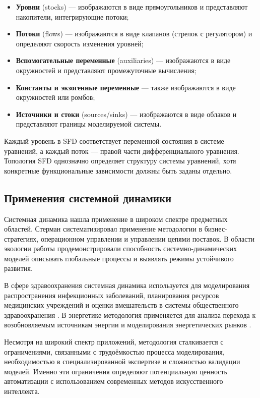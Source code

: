 \begin{itemize}
    \item \textbf{Уровни} (stocks) --- изображаются в виде прямоугольников и представляют накопители, интегрирующие потоки;
    \item \textbf{Потоки} (flows) --- изображаются в виде клапанов (стрелок с регулятором) и определяют скорость изменения уровней;
    \item \textbf{Вспомогательные переменные} (auxiliaries) --- изображаются в виде окружностей и представляют промежуточные вычисления;
    \item \textbf{Константы и экзогенные переменные} --- также изображаются в виде окружностей или ромбов;
    \item \textbf{Источники и стоки} (sources/sinks) --- изображаются в виде облаков и представляют границы моделируемой системы.
\end{itemize}

Каждый уровень в SFD соответствует переменной состояния в системе уравнений, а каждый поток --- правой части дифференциального уравнения. Топология SFD однозначно определяет структуру системы уравнений, хотя конкретные функциональные зависимости должны быть заданы отдельно.

\subsection{Применения системной динамики}

Системная динамика нашла применение в широком спектре предметных областей. Стерман \cite{sterman2000business} систематизировал применение методологии в бизнес-стратегиях, операционном управлении и управлении цепями поставок. В области экологии работы \cite{meadows1972limits} продемонстрировали способность системно-динамических моделей описывать глобальные процессы и выявлять режимы устойчивого развития.

В сфере здравоохранения системная динамика используется для моделирования распространения инфекционных заболеваний, планирования ресурсов медицинских учреждений и оценки вмешательств в системы общественного здравоохранения \cite{rahimi2020healthcare}. В энергетике методология применяется для анализа перехода к возобновляемым источникам энергии и моделирования энергетических рынков \cite{keith2017energy}.

Несмотря на широкий спектр приложений, методология сталкивается с ограничениями, связанными с трудоёмкостью процесса моделирования, необходимостью в специализированной экспертизе и сложностью валидации моделей. Именно эти ограничения определяют потенциальную ценность автоматизации с использованием современных методов искусственного интеллекта.


